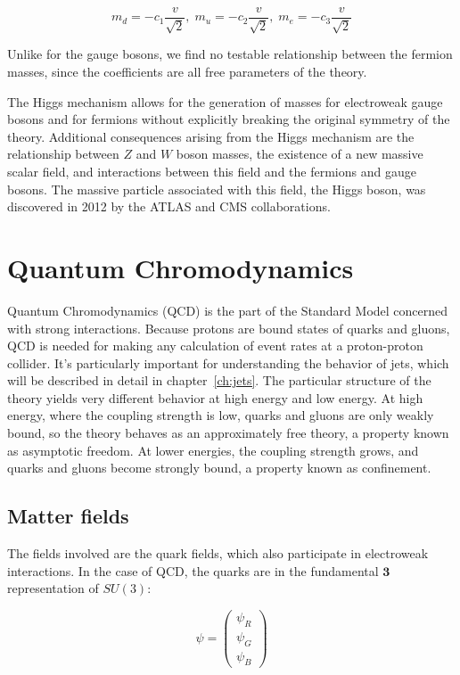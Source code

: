 \begin{equation}\label{ew:fermion_masses}
    m_d = -c_1\frac{v}{\sqrt{2}},\; m_u = -c_2\frac{v}{\sqrt{2}},\; m_e = -c_3\frac{v}{\sqrt{2}}
\end{equation}

Unlike for the gauge bosons, we find no testable relationship between the fermion masses,
since the coefficients are all free parameters of the theory.

The Higgs mechanism allows for the generation of masses for electroweak gauge bosons and for fermions without explicitly
breaking the original symmetry of the theory.
Additional consequences arising from the Higgs mechanism are the relationship between $Z$ and $W$ boson masses,
the existence of a new massive scalar field, and interactions between this field and the fermions and gauge bosons.
The massive particle associated with this field, the Higgs boson, was discovered in 2012 by the ATLAS and CMS collaborations.

\section{Quantum Chromodynamics}\label{sec:sm_qcd}

Quantum Chromodynamics (QCD) is the part of the Standard Model concerned with strong interactions.
Because protons are bound states of quarks and gluons,
QCD is needed for making any calculation of event rates at a proton-proton collider.
It's particularly important for understanding the behavior of jets, which will be described in detail in chapter~\ref{ch:jets}.
The particular structure of the theory yields very different behavior at high energy and low energy.
At high energy, where the coupling strength is low, quarks and gluons are only weakly bound,
so the theory behaves as an approximately free theory, a property known as asymptotic freedom.
At lower energies, the coupling strength grows, and quarks and gluons become strongly bound,
a property known as confinement.

\subsection{Matter fields}\label{subsec:matter fields}

The fields involved are the quark fields, which also participate in electroweak interactions.
In the case of QCD, the quarks are in the fundamental $\boldsymbol{3}$ representation of $SU(3)$:

\begin{equation}\label{eq:qcd_fields}
    \psi = \begin{pmatrix}\psi_R \\ \psi_G \\ \psi_B \end{pmatrix}
\end{equation}

